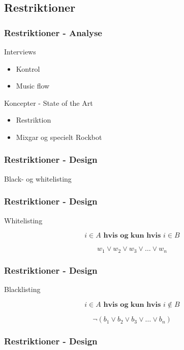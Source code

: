 \subsection{Restriktioner}

\begin{frame}
	\frametitle{Restriktioner - Analyse}
	Interviews
	\begin{itemize}
		\item Kontrol
		\item Music flow
	\end{itemize}
	Koncepter - State of the Art
	\begin{itemize}
		\item Restriktion
		\item Mixgar og specielt Rockbot
	\end{itemize}
\end{frame}

\begin{frame}
	\frametitle{Restriktioner - Design}
	Black- og whitelisting
\end{frame}

\begin{frame}
	\frametitle{Restriktioner - Design}
	Whitelisting
	
	\begin{equation}
		i \in A \textbf{ hvis og kun hvis } i \in B
	\end{equation}
	
	\begin{equation}
		w_1 \vee w_2 \vee w_3 \vee \dots \vee w_n
	\end{equation}
\end{frame}

\begin{frame}
	\frametitle{Restriktioner - Design}
	Blacklisting
	
	\begin{equation}
		i \in A \textbf{ hvis og kun hvis } i \notin B
	\end{equation}
	
	\begin{equation}
		\neg(b_1 \vee b_2 \vee b_3 \vee \dots \vee b_n)
	\end{equation}
\end{frame}

\begin{frame}
\frametitle{Restriktioner - Design}
\begin{algorithmic}[1]

		\EndFor{}
	\EndFunction{}\\
	
\end{algorithmic}
\end{frame}
		
